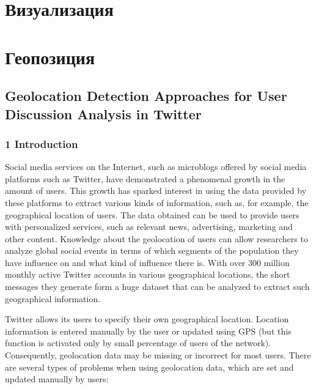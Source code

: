 \section{Визуализация}\label{sec:ch6/sect2}

\section{Геопозиция}\label{sec:ch6/sect3}

\subsection{Geolocation Detection Approaches for User Discussion Analysis in Twitter}\label{subsec:ch6/sec3/sub1}

\subsubsection{1 Introduction}

Social media services on the Internet, such as microblogs offered by social media platforms such as Twitter, have demonstrated a phenomenal growth in the amount of users. This growth has sparked interest in using the data provided by these platforms to extract various kinds of information, such as, for example, the geographical location of users. The data obtained can be used to provide users with personalized services, such as relevant news, advertising, marketing and other content. Knowledge about the geolocation of users can allow researchers to analyze global social events in terms of which segments of the population they have influence on and what kind of influence there is. With over 300 million monthly active Twitter accounts in various geographical locations, the short messages they generate form a huge dataset that can be analyzed to extract such geographical information.

Twitter allows its users to specify their own geographical location. Location information is entered manually by the user or updated using GPS (but this function is activated only by small percentage of users \cite{ChengCaverleeLee} of the network). Consequently, geolocation data may be missing or incorrect for most users. There are several types of problems when using geolocation data, which are set and updated manually by users:

